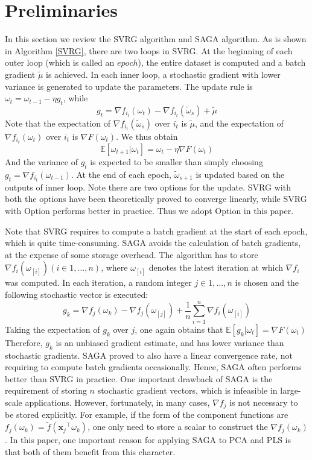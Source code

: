 \documentclass[conference]{IEEEtran}
\begin{document}
\section{Preliminaries}
\label{preliminaries}
 In this section we review the SVRG algorithm and SAGA algorithm. 
 As is shown in Algorithm \ref{SVRG}, there are two loops in SVRG. At the beginning of each outer loop (which is called an $epoch$), the entire dataset is computed and a batch gradient $\tilde{\mu}$ is achieved. In each inner loop, a stochastic gradient with lower variance is generated to update the parameters. The update rule is $\omega_{t} = \omega_{t-1} - \eta g_t$, while 
 $$g_t = \nabla f_{i_t}(\omega_{t}) - \nabla f_{i_t}(\tilde{\omega}_s)+\tilde{\mu}$$
 Note that the expectation of $\nabla f_{i_t}(\tilde{\omega}_s)$ over $i_t$ is $\tilde{\mu}$, and the expectation of $\nabla f_{i_t}(\omega_{t})$ over $i_t$ is $\nabla F(\omega_{t})$. We thus obtain 
 $$\mathbb{E}[\omega_{t+1} | \omega_{t}] = \omega_{t} - \eta\nabla F(\omega_{t})$$
 And the variance of $g_t$ is expected to be smaller than simply choosing $g_t=\nabla f_{i_t}(\omega_{t-1})$. At the end of each epoch, $\tilde{\omega}_{s+1}$ is updated based on the outputs of inner loop. Note there are two options for the update. SVRG with both the options have been theoretically proved to converge linearly, while SVRG with Option \uppercase\expandafter{} performs better in practice. Thus we adopt Option \uppercase\expandafter{} in this paper. 

Note that SVRG requires to compute a batch gradient at the start of each epoch, which is quite time-consuming. SAGA avoids the calculation of batch gradients, at the expense of some storage overhead. The algorithm has to store $\nabla f_{i}(\omega_{[i]})(i \in {1, ... , n})$, where $\omega_{[i]}$ denotes the latest iteration at which $\nabla f_i$ was computed. In each iteration, a random integer $j \in {1, ..., n}$ is chosen and the following stochastic vector is executed:
$$g_k = \nabla f_{j}(\omega_{k}) - \nabla f_{j}(\omega_{[j]}) + \frac{1}{n} \sum\limits_{i=1}^{n}\nabla f_{i}(\omega_{[i]})$$
Taking the expectation of $g_k$ over $j$, one again obtains that 
 $\mathbb{E}[g_k | \omega_t] = \nabla F(\omega_{t})$
 Therefore, $g_k$ is an unbiased gradient estimate, and has lower variance than stochastic gradients. 
 SAGA proved to also have a linear convergence rate, not requiring to compute batch gradients occasionally. Hence, SAGA often performs better than SVRG in practice. One important drawback of SAGA is the requirement of storing $n$ stochastic gradient vectors, which is infeasible in large-scale applications. However, fortunately, in many cases, $\nabla f_{j}$ is not necessary to be stored explicitly. For example, if the form of the component functions are $f_j(\omega_k) = \tilde{f}({\mathbf{x}_j}^{\top}\omega_k)$, one only need to store a scalar to construct the $\nabla f_j(\omega_k)$. In this paper, one important reason for applying SAGA to PCA and PLS is that both of them benefit from this character.
 
\end{document}
